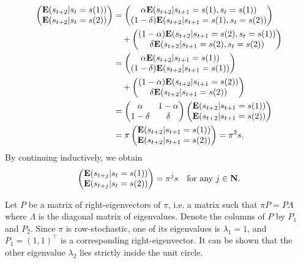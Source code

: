 \documentclass[11pt,letterpaper,reqno,oneside]{article}
\begin{document}
\begin{align*}
	\begin{pmatrix}
		\mathbf{E}(s_{t+2}|s_t=s(1)) \\
		\mathbf{E}(s_{t+2}|s_t=s(2))
	\end{pmatrix}
	&= 
	\begin{pmatrix}
		\alpha \mathbf{E}(s_{t+2}|s_{t+1}=s(1),s_t=s(1)) \\
		(1-\delta) \mathbf{E}(s_{t+2}|s_{t+1}=s(1),s_t=s(2))
	\end{pmatrix}
	\\
	&\quad+
	\begin{pmatrix}
		(1-\alpha) \mathbf{E}(s_{t+2}|s_{t+1}=s(2),s_t=s(1)) \\
		\delta \mathbf{E}(s_{t+2}|s_{t+1}=s(2),s_t=s(2))
	\end{pmatrix}
	\\
	&= 
	\begin{pmatrix}
		\alpha \mathbf{E}(s_{t+2}|s_{t+1}=s(1)) \\
		(1-\delta) \mathbf{E}(s_{t+2}|s_{t+1}=s(1))
	\end{pmatrix}
	\\
	&\quad+
	\begin{pmatrix}
		(1-\alpha) \mathbf{E}(s_{t+2}|s_{t+1}=s(2)) \\
		\delta \mathbf{E}(s_{t+2}|s_{t+1}=s(2))
	\end{pmatrix}
	\\
	&= 
	\begin{pmatrix}
		\alpha & 1-\alpha \\ 1-\delta & \delta
	\end{pmatrix}
	\begin{pmatrix}
		\mathbf{E}(s_{t+2}|s_{t+1}=s(1)) \\
		\mathbf{E}(s_{t+2}|s_{t+1}=s(2))
	\end{pmatrix}
	\\
	&= 
	\pi 
	\begin{pmatrix}
		\mathbf{E}(s_{t+2}|s_{t+1}=s(1)) \\
		\mathbf{E}(s_{t+2}|s_{t+1}=s(2))
	\end{pmatrix}
	= \pi^2 s .
\end{align*}
%
By continuing inductively, we obtain
%
\begin{equation*}
	\begin{pmatrix}
	\mathbf{E}(s_{t+j}|s_t=s(1)) \\
	\mathbf{E}(s_{t+j}|s_t=s(2))
	\end{pmatrix}
	= \pi^j s 
	\quad\text{for any $j \in \mathbf{N}$.}
\end{equation*}


Let $P$ be a matrix of right-eigenvectors of $\pi$, i.e. a matrix such that $\pi P = P \Lambda$ where $\Lambda$ is the diagonal matrix of eigenvalues. Denote the columns of $P$ by $P_1$ and $P_2$. Since $\pi$ is row-stochastic, one of its eigenvalues is $\lambda_1 = 1$, and $P_1 = (1,1)^\top$ is a corresponding right-eigenvector. It can be shown that the other eigenvalue $\lambda_2$ lies strictly inside the unit circle.
\end{document}
